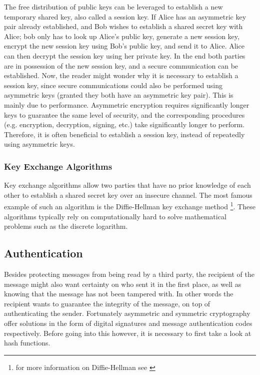 The free distribution of public keys can be leveraged to establish a new temporary shared key, also called a session key. If Alice has an asymmetric key pair already established, and Bob wishes to establish a shared secret key with Alice; bob only has to look up Alice's public key, generate a new session key, encrypt the new session key using Bob's public key, and send it to Alice. Alice can then decrypt the session key using her private key. In the end both parties are in possession of the new session key, and a secure communication can be established. Now, the reader might wonder why it is necessary to establish a session key, since secure communications could also be performed using asymmetric keys (granted they both have an asymmetric key pair). This is mainly due to performance. Asymmetric encryption requires significantly longer keys to guarantee the same level of security, and the corresponding procedures (e.g. encryption, decryption, signing, etc.) take significantly longer to perform. Therefore, it is often beneficial to establish a session key, instead of repeatedly using asymmetric keys.

\subsubsection{Key Exchange Algorithms} 
\label{subsec:key_exhange_algorithms}

Key exchange algorithms allow two parties that have no prior knowledge of each other to establish a shared secret key over an insecure channel. The most famous example of such an algorithm is the Diffie-Hellman key exchange method \footnote{for more information on Diffie-Hellman see \cite{wiki:DH}}. These algorithms typically rely on computationally hard to solve mathematical problems such as the discrete logarithm.

\subsection{Authentication} 
\label{sec:authentication}

Besides protecting messages from being read by a third party, the recipient of the message might also want certainty on who sent it in the first place, as well as knowing that the message has not been tampered with. In other words the recipient wants to guarantee the integrity of the message, on top of authenticating the sender. Fortunately asymmetric and symmetric cryptography offer solutions in the form of digital signatures and message authentication codes respectively. Before going into this however, it is necessary to first take a look at hash functions.

